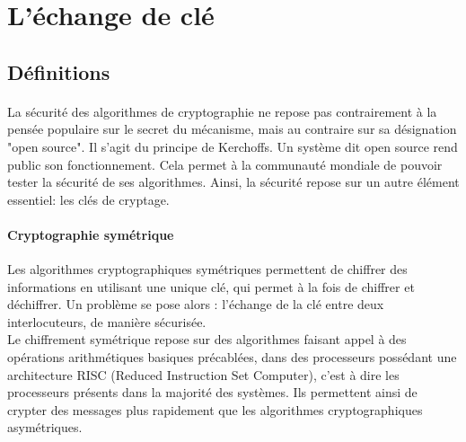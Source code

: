 \section{L'échange de clé}

\subsection {Définitions}
\paragraph{}
La sécurité des algorithmes de cryptographie ne repose pas contrairement à la pensée populaire sur le secret du mécanisme, mais au contraire sur sa désignation "open source". Il s'agit du principe de Kerchoffs\cite{fouque_cryptographie_2003}. Un système dit open source rend public son fonctionnement. Cela permet à la communauté mondiale de pouvoir tester la sécurité de ses algorithmes. Ainsi, la sécurité repose sur un autre élément essentiel: les clés de cryptage.\\

\paragraph{Cryptographie symétrique} \label{crypto symétrique}
Les algorithmes cryptographiques symétriques permettent de chiffrer des informations en utilisant une unique clé, qui permet à la fois de chiffrer et déchiffrer. Un problème se pose alors : l'échange de la clé entre deux interlocuteurs, de manière sécurisée.\\
Le chiffrement symétrique repose sur des algorithmes faisant appel à des opérations arithmétiques basiques précablées, dans des processeurs possédant une architecture RISC (Reduced Instruction Set Computer)\cite{fouque_cryptographie_2003}, c'est à dire les processeurs présents dans la majorité des systèmes. Ils permettent ainsi de crypter des messages plus rapidement que les algorithmes cryptographiques asymétriques. \\

